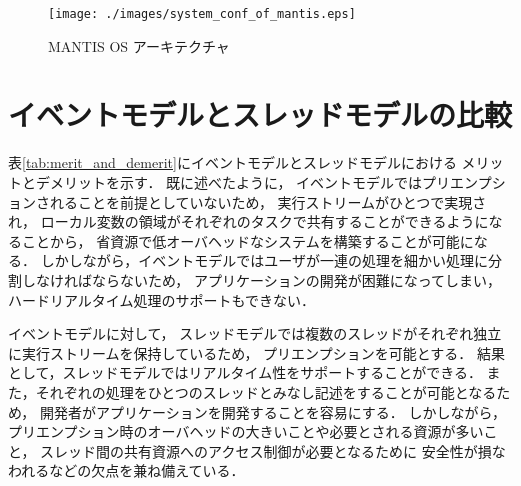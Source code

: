 
\begin{figure}[htbp]
 \begin{center}
  \texttt{[image: ./images/system\_conf\_of\_mantis.eps]}
 \end{center}
 \caption{MANTIS OS アーキテクチャ}
 \label{fig:system_conf_of_mantis}
\end{figure}



\section{イベントモデルとスレッドモデルの比較}\label{sec:comparison_between_event_and_threads}
表\ref{tab:merit_and_demerit}にイベントモデルとスレッドモデルにおける
メリットとデメリットを示す．
既に述べたように，
イベントモデルではプリエンプションされることを前提としていないため，
実行ストリームがひとつで実現され，
ローカル変数の領域がそれぞれのタスクで共有することができるようになることから，
省資源で低オーバヘッドなシステムを構築することが可能になる．
しかしながら，イベントモデルではユーザが一連の処理を細かい処理に分割しなければならないため，
アプリケーションの開発が困難になってしまい，
ハードリアルタイム処理のサポートもできない．


イベントモデルに対して，
スレッドモデルでは複数のスレッドがそれぞれ独立に実行ストリームを保持しているため，
プリエンプションを可能とする．
結果として，スレッドモデルではリアルタイム性をサポートすることができる．
また，それぞれの処理をひとつのスレッドとみなし記述をすることが可能となるため，
開発者がアプリケーションを開発することを容易にする．
しかしながら，プリエンプション時のオーバヘッドの大きいことや必要とされる資源が多いこと，
スレッド間の共有資源へのアクセス制御が必要となるために
安全性が損なわれるなどの欠点を兼ね備えている．


